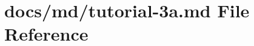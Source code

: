 \hypertarget{tutorial-3a_8md}{}\section{docs/md/tutorial-\/3a.md File Reference}
\label{tutorial-3a_8md}
